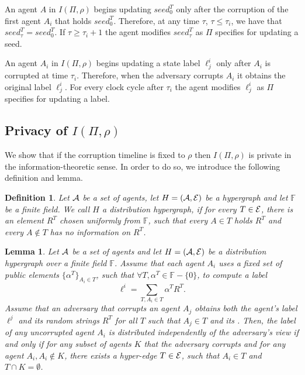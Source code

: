 \documentclass[letterpaper,11pt]{article}
\newtheorem{definition}{Definition}
\newtheorem{lemma}[theorem]{Lemma}
\begin{document}
An agent $A$ in $I(\Pi, \rho)$ begins updating $seed^T_0$ only after the corruption of the first agent $A_i$ that holds $seed^T_0$. Therefore, at any time $\tau$, $\tau \leq \tau_i$, we have that $seed^T_{\tau} = seed^T_0$. If $\tau \geq \tau_i+1$ the agent modifies $seed^T_{\tau}$ as $\Pi$ specifies for updating a seed.
 
An agent $A_i$ in $I(\Pi, \rho)$ begins updating a state label $\ell^i_j$ only after $A_i$ is corrupted at time $\tau_i$. Therefore, when the adversary corrupts $A_i$ it obtains the original label $\ell^i_j$. For every clock cycle after $\tau_i$ the agent modifies $\ell^i_j$ as $\Pi$ specifies for updating a label.

\subsection{Privacy of $I(\Pi, \rho)$}
We show that if the corruption timeline is fixed to $\rho$ then $I(\Pi, \rho)$ is private in the information-theoretic sense. In order to do so, we introduce the following definition and lemma.
\begin{definition}
Let ${\cal A}$ be a set of agents, let $H=({\cal A}, {\cal E})$ be a hypergraph and let $\mathbb{F}$ be a finite field. We call $H$ a {\em distribution hypergraph}, if for every $T \in {\cal E}$, there is an element $R^T$ chosen uniformly from $\mathbb{F}$, such that every $A\in T$ holds $R^T$ and every $A\notin T$ has no information on $R^T$.
\end{definition}

\begin{lemma} 
\label{prop-privacy}
Let ${\cal A}$ be a set of agents and let $H=({\cal A}, {\cal E})$ be a distribution hypergraph over a finite field $\mathbb{F}$. Assume that each agent $A_i$ uses a fixed set of public elements $\{\alpha^T\}_{A_i \in T}$, such that $\forall T, \alpha^T \in \mathbb{F}-\{0\}$,  to compute a label 
$$\ell^i=\sum_{T, A_i \in T} \alpha^T R^T.$$
Assume that an adversary that corrupts an agent $A_j$ obtains both the agent's label $\ell^j$ and its random strings $R^T$ for all $T$ such that $A_j \in T$ and its . Then, the label of any uncorrupted agent $A_i$ is distributed independently of the adversary's view if and only if for any subset of agents $K$ that the adversary corrupts and for any agent $A_i, A_i \not \in K$, there exists a hyper-edge $T\in {\cal E}$, such that $A_i \in T$ and $T\cap K=\emptyset$. 
\end{lemma}
\end{document}
